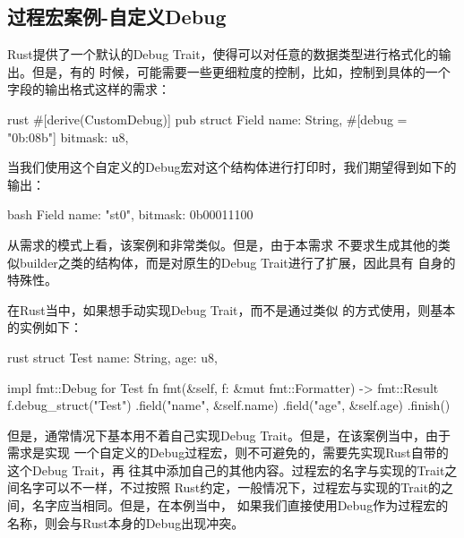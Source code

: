 \subsection{过程宏案例-自定义Debug}
Rust提供了一个默认的Debug Trait，使得可以对任意的数据类型进行格式化的输出。但是，有的
时候，可能需要一些更细粒度的控制，比如，控制到具体的一个字段的输出格式这样的需求：
\begin{code-block}{rust}
#[derive(CustomDebug)]
pub struct Field {
    name: String,
    #[debug = "0b{:08b}"]
    bitmask: u8,
}
\end{code-block}
当我们使用这个自定义的Debug宏对这个结构体进行打印时，我们期望得到如下的输出：
\begin{code-block}{bash}
Field { name: "st0", bitmask: 0b00011100 }
\end{code-block}

从需求的模式上看，该案例和非常类似。但是，由于本需求
不要求生成其他的类似builder之类的结构体，而是对原生的Debug Trait进行了扩展，因此具有
自身的特殊性。

在Rust当中，如果想手动实现Debug Trait，而不是通过类似
的方式使用，则基本的实例如下：
\begin{code-block}{rust}
struct Test {
    name: String,
    age: u8,
}

impl fmt::Debug for Test {
    fn fmt(&self, f: &mut fmt::Formatter) -> fmt::Result {
        f.debug_struct("Test")
            .field("name", &self.name)
            .field("age", &self.age)
            .finish()
    }
}
\end{code-block}
但是，通常情况下基本用不着自己实现Debug Trait。但是，在该案例当中，由于需求是实现
一个自定义的Debug过程宏，则不可避免的，需要先实现Rust自带的这个Debug Trait，再
往其中添加自己的其他内容。过程宏的名字与实现的Trait之间名字可以不一样，不过按照
Rust约定，一般情况下，过程宏与实现的Trait的之间，名字应当相同。但是，在本例当中，
如果我们直接使用Debug作为过程宏的名称，则会与Rust本身的Debug出现冲突。

